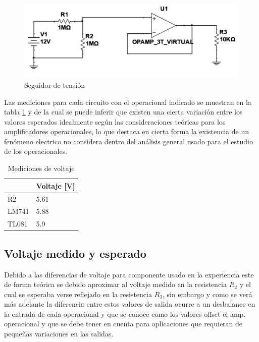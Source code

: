\begin{figure}[h]
	\centering
	\includegraphics[width=0.8\linewidth]{media/seguidor-tension}
	\caption{Seguidor de tensión}
	\label{fig:seguidor-tension}
\end{figure}

Las mediciones para cada circuito con el operacional indicado se muestran en la tabla \ref{tab:mediciones-voltaje} y de la cual se puede inferir que existen una cierta variación entre los valores esperados idealmente según las consideraciones teóricas para los amplificadores operacionales, lo que destaca en cierta forma la existencia de un fenómeno electrico no considera dentro del análisis general usado para el estudio de los operacionales.

\begin{table}[]
	\centering
	\begin{tabular}{|l|l|}
		\hline
		& Voltaje {[}V{]} \\ \hline
		R2    & 5.61            \\ \hline
		LM741 & 5.88            \\ \hline
		TL081 & 5.9             \\ \hline
	\end{tabular}
	\caption{Mediciones de voltaje}
	\label{tab:mediciones-voltaje}
\end{table}

\subsection{Voltaje medido y esperado}
Debido a las diferencias de voltaje para componente usado en la experiencia este de forma teórica se debido aproximar al voltaje medido en la resistencia $R_2$ y el cual se esperaba verse reflejado en la resistencia $R_3$, sin embargo y como se verá más adelante la diferencia entre estos valores de salida ocurre a un desbalance en la entrada de cada operacional y que se conoce como los valores offset el amp. operacional y que se debe tener en cuenta para aplicaciones que requieran de pequeñas variaciones en las salidas.

